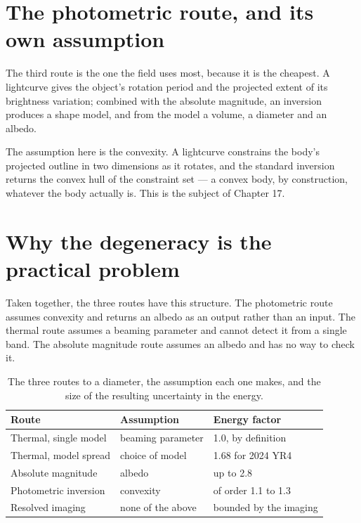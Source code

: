 \section{The photometric route, and its own assumption}

The third route is the one the field uses most, because it is the cheapest.
A lightcurve gives the object's rotation period and the projected extent of
its brightness variation; combined with the absolute magnitude, an inversion
produces a shape model, and from the model a volume, a diameter and an
albedo.

The assumption here is the convexity. A lightcurve constrains the body's
projected outline in two dimensions as it rotates, and the standard inversion
returns the convex hull of the constraint set --- a convex body, by
construction, whatever the body actually is. This is the subject of
Chapter 17.

\section{Why the degeneracy is the practical problem}

Taken together, the three routes have this structure. The photometric route
assumes convexity and returns an albedo as an output rather than an input.
The thermal route assumes a beaming parameter and cannot detect it from a
single band. The absolute magnitude route assumes an albedo and has no way
to check it.

\begin{table}[!htbp]
\centering
\small
\caption{The three routes to a diameter, the assumption each one makes, and
the size of the resulting uncertainty in the energy.}
\label{tab:routes}
\begin{tabularx}{\textwidth}{@{}P{1.36in}P{1.68in}P{1.23in}@{}}
\toprule
{}
\textbf{Route} & \textbf{Assumption} & \textbf{Energy factor} \\
\midrule
Thermal, single model & beaming parameter & 1.0, by definition \\
Thermal, model spread & choice of model & 1.68 for 2024 YR4 \\
Absolute magnitude & albedo & up to 2.8 \\
Photometric inversion & convexity & of order 1.1 to 1.3 \\
Resolved imaging & none of the above & bounded by the imaging \\
\bottomrule
\end{tabularx}
\end{table}

